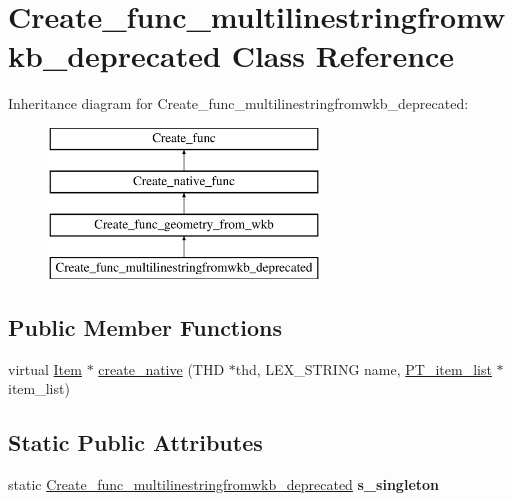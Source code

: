 \hypertarget{classCreate__func__multilinestringfromwkb__deprecated}{}\section{Create\+\_\+func\+\_\+multilinestringfromwkb\+\_\+deprecated Class Reference}
\label{classCreate__func__multilinestringfromwkb__deprecated}
Inheritance diagram for Create\+\_\+func\+\_\+multilinestringfromwkb\+\_\+deprecated\+:\begin{figure}[H]
\begin{center}
\leavevmode
\includegraphics[height=4.000000cm]{classCreate__func__multilinestringfromwkb__deprecated}
\end{center}
\end{figure}
\subsection*{Public Member Functions}
\begin{DoxyCompactItemize}
\item 
virtual \mbox{\hyperlink{classItem}{Item}} $\ast$ \mbox{\hyperlink{classCreate__func__multilinestringfromwkb__deprecated_a88004232b80c2ff45f41748a7d293bb6}{create\+\_\+native}} (T\+HD $\ast$thd, L\+E\+X\+\_\+\+S\+T\+R\+I\+NG name, \mbox{\hyperlink{classPT__item__list}{P\+T\+\_\+item\+\_\+list}} $\ast$item\+\_\+list)
\end{DoxyCompactItemize}
\subsection*{Static Public Attributes}
\begin{DoxyCompactItemize}
\item 
\mbox{\label{classCreate__func__multilinestringfromwkb__deprecated_acdb500482146dd0ecd6d8be4463934dc}} 
static \mbox{\hyperlink{classCreate__func__multilinestringfromwkb__deprecated}{Create\+\_\+func\+\_\+multilinestringfromwkb\+\_\+deprecated}} {\bfseries s\+\_\+singleton}
\end{DoxyCompactItemize}
